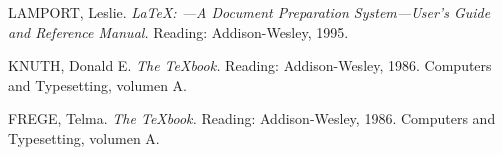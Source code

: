 \begin{thebibliography}{99}
 LAMPORT, Leslie. \emph{\LaTeX : ---A Document Preparation
System---User's Guide and Reference Manual.} Reading: Addison-Wesley, 1995.

 KNUTH, Donald E. \emph{The \TeX book.} Reading:
Addison-Wesley, 1986. Computers and Typesetting, volumen A.

 FREGE, Telma. \emph{The \TeX book.} Reading:
Addison-Wesley, 1986. Computers and Typesetting, volumen A.

\end{thebibliography}
